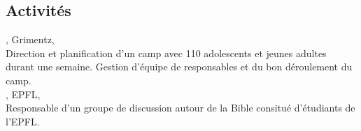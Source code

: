 \documentclass[mm, 11pt]{simple_style}
\begin{document}
\begin{resume}
\section{Activit\'es}
, Grimentz, \\
Direction et planification d’un camp avec 110 adolescents et jeunes adultes durant une semaine. Gestion d'\'equipe de responsables et du bon d\'eroulement du camp.\\
, EPFL, \\
Responsable d'un groupe de discussion autour de la Bible consitu\'e d'\'etudiants de l'EPFL.


\end{resume}
\end{document}
